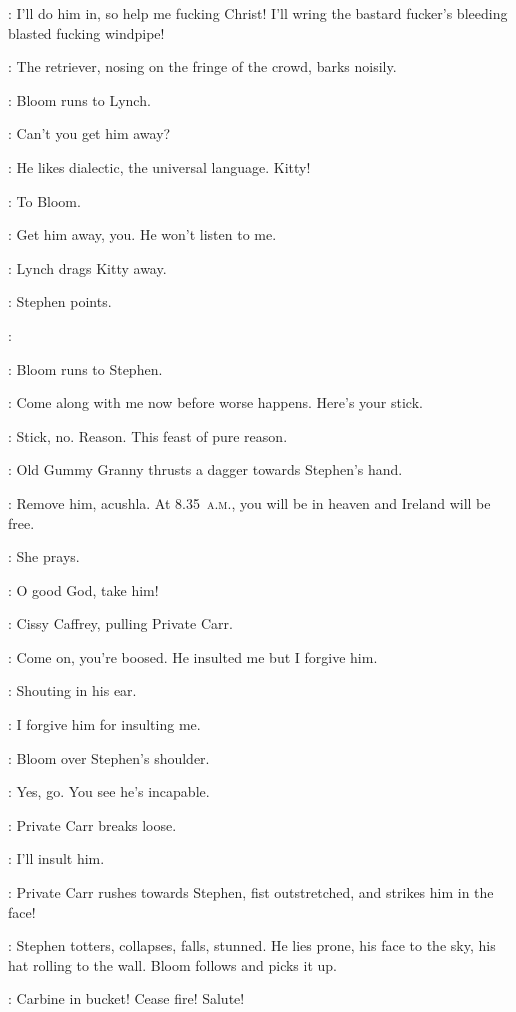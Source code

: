 \Carr:
I'll do him in, so help me fucking Christ!
I'll wring the bastard fucker's bleeding blasted fucking windpipe!

:
The retriever, nosing on the fringe of the crowd, barks noisily.

:
Bloom runs to Lynch.

\Bloom:
Can't you get him away?

\Lynch:
He likes dialectic, the universal language.
Kitty!

:
To Bloom.

\Lynch:
Get him away, you.
He won't listen to me.

:
Lynch drags Kitty away.

:
Stephen points.

\Stephen:

:
Bloom runs to Stephen.

\Bloom:
Come along with me now before worse happens.
Here's your stick.

\Stephen:
Stick, no.
Reason.
This feast of pure reason.

:
Old Gummy Granny thrusts a dagger towards Stephen's hand.

\GummyGranny:
Remove him, acushla.
At 8.35~\textsc{a.m.}, you will be in heaven and Ireland will be free.

:
She prays.

\GummyGranny:
O good God, take him!

:
Cissy Caffrey, pulling Private Carr.

\Cissy:
Come on, you're boosed.
He insulted me but I forgive him.

:
Shouting in his ear.

\Cissy:
I forgive him for insulting me.

:
Bloom over Stephen's shoulder.

\Bloom:
Yes, go.
You see he's incapable.

:
Private Carr breaks loose.

\Carr:
I'll insult him.

:
Private Carr rushes towards Stephen, fist outstretched, and strikes him in the face!

:
Stephen totters, collapses, falls, stunned.
He lies prone, his face to the sky, his hat rolling to the wall.
Bloom follows and picks it up.%

\MajorTweedy[1]:
Carbine in bucket!
Cease fire!
Salute!

